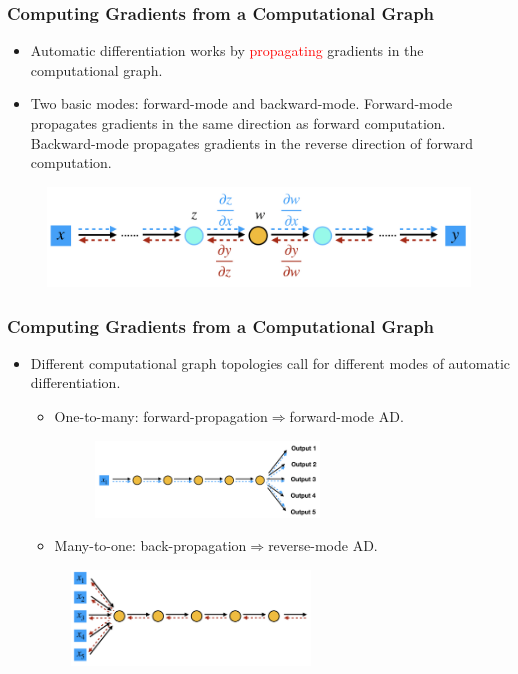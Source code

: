 \documentclass{beamer}
\begin{document}
\begin{frame}
	\frametitle{Computing Gradients from a Computational Graph}
	\begin{itemize}
		\item Automatic differentiation works by \textcolor{red}{propagating} gradients in the computational graph.
		\item Two basic modes: forward-mode and backward-mode. Forward-mode propagates gradients in the same direction as forward computation. Backward-mode propagates gradients in the reverse direction of forward computation.
	\end{itemize}
	\begin{figure}[hbt]
		\centering
		\includegraphics[width=1.0\textwidth]{figures/fb}
	\end{figure}

\end{frame}


\begin{frame}
	\frametitle{Computing Gradients from a Computational Graph}
	\begin{itemize}
		\item Different computational graph topologies call for different modes of automatic differentiation.
		      \begin{itemize}
			      \item One-to-many: forward-propagation$\Rightarrow$forward-mode AD.
			            \begin{figure}[hbt]
				            \includegraphics[width=0.6\textwidth]{figures/onetomany}
			            \end{figure}
			      \item Many-to-one: back-propagation$\Rightarrow$reverse-mode AD.
		      \end{itemize}
		      \begin{figure}[hbt]
			      \includegraphics[width=0.6\textwidth]{figures/manytoone}
		      \end{figure}
	\end{itemize}

\end{frame}
\end{document}
